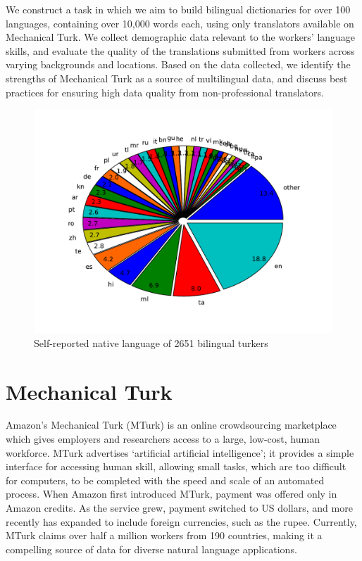 \documentclass[11pt]{article}
\begin{document}
We construct a task in which we aim to build bilingual dictionaries for over 100 languages, containing over 10,000 words each, using only translators available on Mechanical Turk. We collect demographic data relevant to the workers' language skills, and evaluate the quality of the translations submitted from workers across varying backgrounds and locations. Based on the data collected, we identify the strengths of Mechanical Turk as a source of multilingual data, and discuss best practices for ensuring high data quality from non-professional translators.

\begin{figure}[h]
\centering
\includegraphics[width=7in]{figures/natlang-pie}
\caption{Self-reported native language of 2651 bilingual turkers}
\label{lang-pie}
\end{figure}

\section{Mechanical Turk}
Amazon's Mechanical Turk (MTurk) is an online crowdsourcing marketplace which gives employers and researchers access to a large, low-cost, human workforce. MTurk advertises `artificial artificial intelligence'; it provides a simple interface for accessing human skill, allowing small tasks, which are too difficult for computers, to be completed with the speed and scale of an automated process. When Amazon first introduced MTurk, payment was offered only in Amazon credits. As the service grew, payment switched to US dollars, and more recently has expanded to include foreign currencies, such as the rupee. Currently, MTurk claims over half a million workers from 190 countries, making it a compelling source of data for diverse natural language applications.
\end{document}
